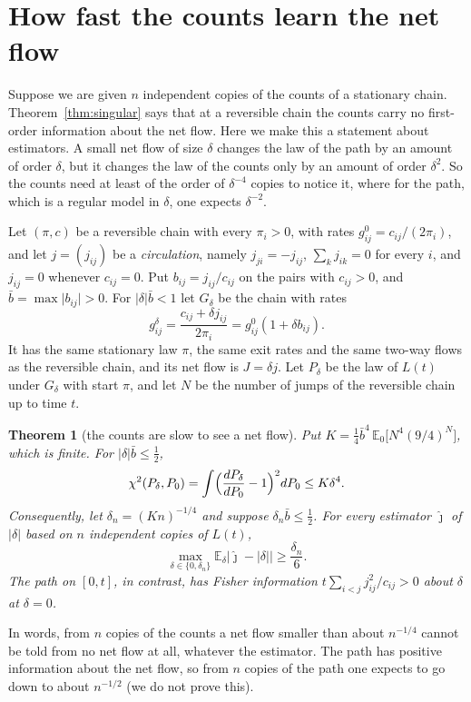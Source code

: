 \documentclass[11pt]{article}
\newtheorem{theorem}{Theorem}[section]
\theoremstyle{definition}
\theoremstyle{remark}
\newcommand{\E}{\mathbb E}
\begin{document}
\section{How fast the counts learn the net flow}\label{sec:rates}

Suppose we are given $n$ independent copies of the counts of a stationary
chain. Theorem~\ref{thm:singular} says that at a reversible chain the counts
carry no first-order information about the net flow. Here we make this a
statement about estimators. A small net flow of size $\delta$ changes the law
of the path by an amount of order $\delta$, but it changes the law of the
counts only by an amount of order $\delta^2$. So the counts need at least of
the order of $\delta^{-4}$ copies to notice it, where for the path, which is a
regular model in $\delta$, one expects $\delta^{-2}$.

Let $(\pi,c)$ be a reversible chain with every $\pi_i>0$, with rates $g^0_{ij}=c_{ij}/(2\pi_i)$, and
let $j=(j_{ij})$ be a \emph{circulation}, namely $j_{ji}=-j_{ij}$,
$\sum_kj_{ik}=0$ for every $i$, and $j_{ij}=0$ whenever $c_{ij}=0$. Put
$b_{ij}=j_{ij}/c_{ij}$ on the pairs with $c_{ij}>0$, and
$\bar b=\max\lvert b_{ij}\rvert>0$. For $\lvert\delta\rvert\bar b<1$ let
$G_\delta$ be the chain with rates
\[
 g^\delta_{ij}=\frac{c_{ij}+\delta j_{ij}}{2\pi_i}=g^0_{ij}(1+\delta b_{ij}).
\]
It has the same stationary law $\pi$, the same exit rates and the same
two-way flows as the reversible chain, and its net flow is $J=\delta j$. Let
$P_\delta$ be the law of $L(t)$ under $G_\delta$ with start $\pi$, and let $N$
be the number of jumps of the reversible chain up to time $t$.

\begin{theorem}[the counts are slow to see a net flow]\label{thm:lecam}
Put $K=\frac14\bar b^4\,\E_0\bigl[N^4(9/4)^N\bigr]$, which is finite. For
$\lvert\delta\rvert\bar b\le\frac12$,
\[
 \chi^2(P_\delta,P_0)=\int\Bigl(\frac{dP_\delta}{dP_0}-1\Bigr)^2dP_0
 \le K\delta^4 .
\]
Consequently, let $\delta_n=(Kn)^{-1/4}$ and suppose $\delta_n\bar b\le\frac12$.
For every estimator $\hat\jmath$ of $\lvert\delta\rvert$ based on $n$
independent copies of $L(t)$,
\[
 \max_{\delta\in\{0,\delta_n\}}\E_\delta\bigl\lvert\hat\jmath-\lvert\delta\rvert\bigr\rvert
 \ge\frac{\delta_n}6 .
\]
The path on $[0,t]$, in contrast, has Fisher information
$t\sum_{i<j}j_{ij}^2/c_{ij}>0$ about $\delta$ at $\delta=0$.
\end{theorem}

In words, from $n$ copies of the counts a net flow smaller than about
$n^{-1/4}$ cannot be told from no net flow at all, whatever the estimator. The
path has positive information about the net flow, so from $n$ copies of the
path one expects to go down to about $n^{-1/2}$ (we do not prove this).
\end{document}
